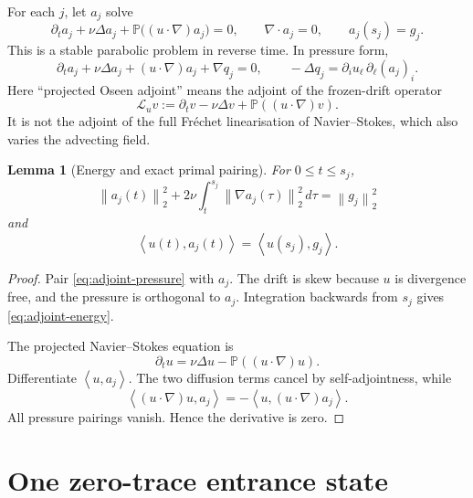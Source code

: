 \documentclass[11pt]{article}
\newtheorem{lemma}[theorem]{Lemma}
\theoremstyle{remark}
\newcommand{\Pj}{\mathbb P}
\newcommand{\ip}[2]{\left\langle #1,#2\right\rangle}
\newcommand{\norm}[1]{\left\|#1\right\|}
\begin{document}
For each \(j\), let \(a_j\) solve
\begin{equation}
 \label{eq:adjoint}
 \partial_ta_j+\nu\Delta a_j
 +\Pj\bigl((u\cdot\nabla)a_j\bigr)=0,
 \qquad
 \nabla\cdot a_j=0,
 \qquad
 a_j(s_j)=g_j.
\end{equation}
This is a stable parabolic problem in reverse time.  In pressure form,
\begin{equation}
 \label{eq:adjoint-pressure}
 \partial_ta_j+\nu\Delta a_j
 +(u\cdot\nabla)a_j+\nabla q_j=0,
 \qquad
 -\Delta q_j
 =
 \partial_i u_\ell\,\partial_\ell(a_j)_i.
\end{equation}
Here ``projected Oseen adjoint'' means the adjoint of the frozen-drift
operator
\[
 \mathcal L_u v
 :=
 \partial_t v-\nu\Delta v+\Pj((u\cdot\nabla)v).
\]
It is not the adjoint of the full Fr\'echet linearisation of
Navier--Stokes, which also varies the advecting field.

\begin{lemma}[Energy and exact primal pairing]
\label{lem:identities}
For \(0\leq t\leq s_j\),
\begin{equation}
 \label{eq:adjoint-energy}
 \boxed{
 \norm{a_j(t)}_2^2
 +2\nu\int_t^{s_j}\norm{\nabla a_j(\tau)}_2^2\,d\tau
 =
 \norm{g_j}_2^2
 }
\end{equation}
and
\begin{equation}
 \label{eq:pairing}
 \boxed{
 \ip{u(t)}{a_j(t)}
 =
 \ip{u(s_j)}{g_j}.
 }
\end{equation}
\end{lemma}

\begin{proof}
Pair \eqref{eq:adjoint-pressure} with \(a_j\).  The drift is skew
because \(u\) is divergence free, and the pressure is orthogonal to
\(a_j\).  Integration backwards from \(s_j\) gives
\eqref{eq:adjoint-energy}.

The projected Navier--Stokes equation is
\[
 \partial_tu
 =
 \nu\Delta u-\Pj((u\cdot\nabla)u).
\]
Differentiate \(\ip{u}{a_j}\).  The two diffusion terms cancel by
self-adjointness, while
\[
 \ip{(u\cdot\nabla)u}{a_j}
 =
 -\ip{u}{(u\cdot\nabla)a_j}.
\]
All pressure pairings vanish.  Hence the derivative is zero.
\end{proof}

\section{One zero-trace entrance state}
\end{document}
